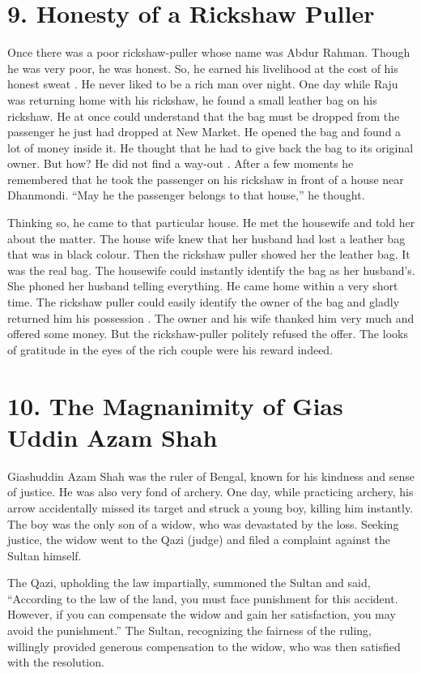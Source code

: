 \documentclass{article}
\begin{document}
\section*{9. Honesty of a Rickshaw Puller}
Once there was a poor rickshaw-puller whose name was Abdur Rahman. Though he was very poor, he was honest. So, he earned his livelihood at the cost of his honest sweat . He never liked to be a rich man over night. One day while Raju was returning home with his rickshaw, he found a small leather bag on his rickshaw. He at once could understand that the bag must be dropped from the passenger he just had dropped at New Market. He opened the bag and found a lot of money inside it. He thought that he had to give back the bag to its original owner. But how? He did not find a way-out . After a few moments he remembered that he took the passenger on his rickshaw in front of a house near Dhanmondi. “May he the passenger belongs to that house,” he thought.

Thinking so, he came to that particular house. He met the housewife and told her about the matter. The house wife knew that her husband had lost a leather bag that was in black colour. Then the rickshaw puller showed her the leather bag. It was the real bag. The housewife could instantly identify the bag as her husband’s. She phoned her husband telling everything. He came home within a very short time. The rickshaw puller could easily identify the owner of the bag and gladly returned him his possession . The owner and his wife thanked him very much and offered some money. But the rickshaw-puller politely refused the offer. The looks of gratitude in the eyes of the rich couple were his reward indeed.
\section*{10. The Magnanimity of Gias Uddin Azam Shah}
Giashuddin Azam Shah was the ruler of Bengal, known for his kindness and sense of justice. He was also very fond of archery. One day, while practicing archery, his arrow accidentally missed its target and struck a young boy, killing him instantly. The boy was the only son of a widow, who was devastated by the loss. Seeking justice, the widow went to the Qazi (judge) and filed a complaint against the Sultan himself.

The Qazi, upholding the law impartially, summoned the Sultan and said, “According to the law of the land, you must face punishment for this accident. However, if you can compensate the widow and gain her satisfaction, you may avoid the punishment.” The Sultan, recognizing the fairness of the ruling, willingly provided generous compensation to the widow, who was then satisfied with the resolution.
\end{document}
